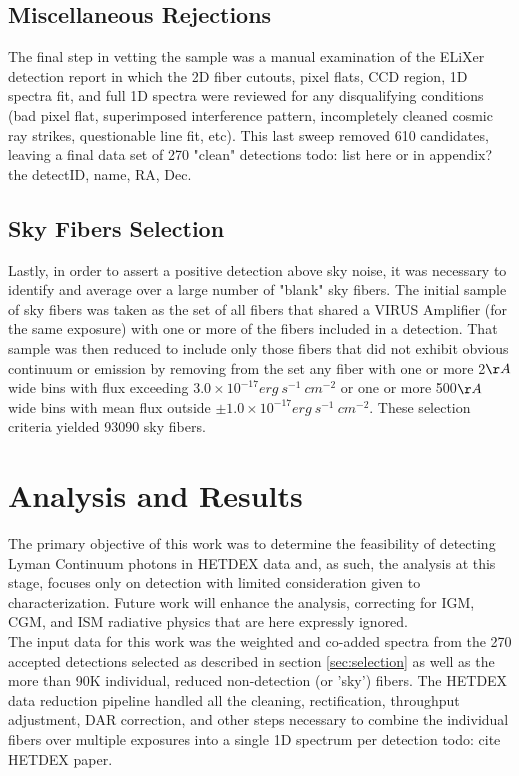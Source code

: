 \documentclass{aastex62}
\begin{document}
\subsection{Miscellaneous Rejections}
The final step in vetting the sample was a manual examination of the ELiXer detection report in which the 2D fiber cutouts, pixel flats, CCD region, 1D spectra fit, and full 1D spectra were reviewed for any disqualifying conditions (bad pixel flat, superimposed interference pattern, incompletely cleaned cosmic ray strikes, questionable line fit, etc). This last sweep removed 610 candidates, leaving a final data set of 270 "clean" detections { \color{red} todo: list here or in appendix? the detectID, name, RA, Dec}.  


\subsection{Sky Fibers Selection}

Lastly, in order to assert a positive detection above sky noise, it was necessary to identify and average over a large number of "blank" sky fibers. The initial sample of sky fibers was taken as the set of all fibers that shared a VIRUS Amplifier (for the same exposure) with one or more of the fibers included in a detection. That sample was then reduced to include only those fibers that did not exhibit obvious continuum or emission by removing from the set any fiber with one or more 2$\AA$ wide bins with flux exceeding $3.0\times 10^{-17} erg\ s^{-1}\ cm^{-2}$ or one or more 500$\AA$ wide bins with mean flux outside $\pm 1.0 \times 10^{-17} erg\ s^{-1}\ cm^{-2}$. These selection criteria yielded 93090 sky fibers.  \\

\section{Analysis and Results} \label{sec:analysis}

The primary objective of this work was to determine the feasibility of detecting Lyman Continuum photons in HETDEX data and, as such, the analysis at this stage, focuses only on detection with limited consideration given to characterization. Future work will enhance the analysis, correcting for IGM, CGM, and ISM radiative physics that are here expressly ignored.\\

The input data for this work was the weighted and co-added spectra from the 270 accepted detections selected as described in section \ref{sec:selection} as well as the more than 90K individual, reduced non-detection (or 'sky') fibers. The HETDEX data reduction pipeline handled all the cleaning, rectification, throughput adjustment, DAR correction, and other steps necessary to combine the individual fibers over multiple exposures into a single 1D spectrum per detection { \color{red} todo: cite HETDEX paper}.
\end{document}
